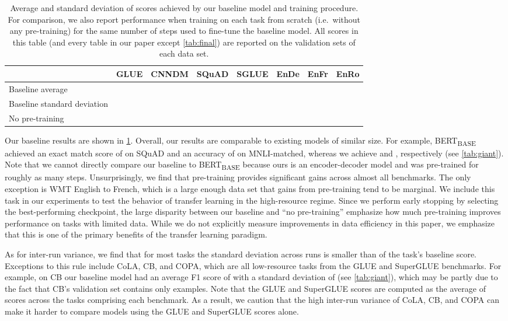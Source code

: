 \documentclass[twoside,11pt]{article}
\newcommand{\bsl}{\makebox[0pt][r]{\raisebox{0.05em}{}}}
\begin{document}
\begin{table}
\footnotesize
\centering
\begin{tabular}{l c c c c c c c}
\toprule
                                & GLUE        & CNNDM       & SQuAD       & SGLUE       & EnDe        & EnFr        & EnRo    \\
\midrule
    \bsl Baseline average       &  &  &  &  &  &  &  \\
    Baseline standard deviation &      &      &      &      &      &      &  \\
    No pre-training             &      &      &      &      &      &  &  \\
\bottomrule
\end{tabular}
\caption{
Average and standard deviation of scores achieved by our baseline model and training procedure.
For comparison, we also report performance when training on each task from scratch (i.e.\ without any pre-training) for the same number of steps used to fine-tune the baseline model.
All scores in this table (and every table in our paper except \cref{tab:final}) are reported on the validation sets of each data set.
}
\label{tab:baseline}
\end{table}

Our baseline results are shown in \cref{tab:baseline}.
Overall, our results are comparable to existing models of similar size.
For example, BERT\textsubscript{BASE} achieved an exact match score of  on SQuAD and an accuracy of  on MNLI-matched, whereas we achieve  and , respectively (see \cref{tab:giant}).
Note that we cannot directly compare our baseline to BERT\textsubscript{BASE} because ours is an encoder-decoder model and was pre-trained for roughly  as many steps.
Unsurprisingly, we find that pre-training provides significant gains across almost all benchmarks.
The only exception is WMT English to French, which is a large enough data set that gains from pre-training tend to be marginal.
We include this task in our experiments to test the behavior of transfer learning in the high-resource regime.
Since we perform early stopping by selecting the best-performing checkpoint, the large disparity between our baseline and ``no pre-training'' emphasize how much pre-training improves performance on tasks with limited data.
While we do not explicitly measure improvements in data efficiency in this paper, we emphasize that this is one of the primary benefits of the transfer learning paradigm.

As for inter-run variance, we find that for most tasks the standard deviation across runs is smaller than  of the task's baseline score.
Exceptions to this rule include CoLA, CB, and COPA, which are all low-resource tasks from the GLUE and SuperGLUE benchmarks.
For example, on CB our baseline model had an average F1 score of  with a standard deviation of  (see \cref{tab:giant}), which may be partly due to the fact that CB's validation set contains only  examples.
Note that the GLUE and SuperGLUE scores are computed as the average of scores across the tasks comprising each benchmark.
As a result, we caution that the high inter-run variance of CoLA, CB, and COPA can make it harder to compare models using the GLUE and SuperGLUE scores alone.
\end{document}
